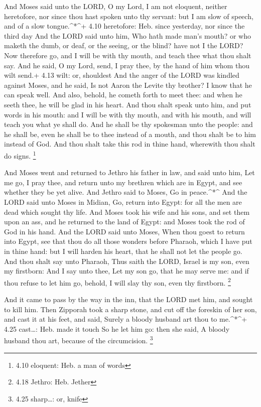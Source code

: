  And Moses said unto the LORD, O my Lord, I am not
eloquent, neither heretofore, nor since thou hast spoken unto thy
servant: but I am slow of speech, and of a slow tongue.\^{}*\^{}+ 4.10
heretofore: Heb. since yesterday, nor since the third day 
And the LORD said unto him, Who hath made man's mouth? or who maketh the
dumb, or deaf, or the seeing, or the blind? have not I the LORD?
 Now therefore go, and I will be with thy mouth, and teach
thee what thou shalt say.  And he said, O my Lord, send, I
pray thee, by the hand of him whom thou wilt send.+ 4.13 wilt: or,
shouldest  And the anger of the LORD was kindled against
Moses, and he said, Is not Aaron the Levite thy brother? I know that he
can speak well. And also, behold, he cometh forth to meet thee: and when
he seeth thee, he will be glad in his heart.  And thou
shalt speak unto him, and put words in his mouth: and I will be with thy
mouth, and with his mouth, and will teach you what ye shall do.
 And he shall be thy spokesman unto the people: and he
shall be, even he shall be to thee instead of a mouth, and thou shalt be
to him instead of God.  And thou shalt take this rod in
thine hand, wherewith thou shalt do signs. \footnote{4.10 eloquent: Heb.
  a man of words}

 And Moses went and returned to Jethro his father in law,
and said unto him, Let me go, I pray thee, and return unto my brethren
which are in Egypt, and see whether they be yet alive. And Jethro said
to Moses, Go in peace.\^{}*\^{}  And the LORD said unto
Moses in Midian, Go, return into Egypt: for all the men are dead which
sought thy life.  And Moses took his wife and his sons, and
set them upon an ass, and he returned to the land of Egypt: and Moses
took the rod of God in his hand.  And the LORD said unto
Moses, When thou goest to return into Egypt, see that thou do all those
wonders before Pharaoh, which I have put in thine hand: but I will
harden his heart, that he shall not let the people go.  And
thou shalt say unto Pharaoh, Thus saith the LORD, Israel is my son, even
my firstborn:  And I say unto thee, Let my son go, that he
may serve me: and if thou refuse to let him go, behold, I will slay thy
son, even thy firstborn. \footnote{4.18 Jethro: Heb. Jether}

 And it came to pass by the way in the inn, that the LORD
met him, and sought to kill him.  Then Zipporah took a
sharp stone, and cut off the foreskin of her son, and cast it at his
feet, and said, Surely a bloody husband art thou to me.\^{}*\^{}+ 4.25
cast\ldots: Heb. made it touch  So he let him go: then she
said, A bloody husband thou art, because of the circumcision.
\footnote{4.25 sharp\ldots: or, knife}

